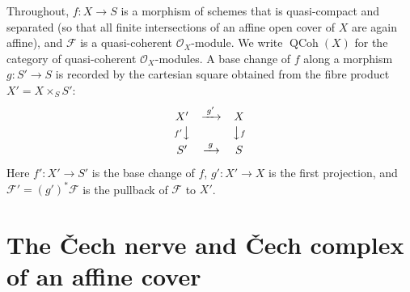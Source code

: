 Throughout, \(f : X \to S\) is a morphism of schemes that is quasi-compact and
separated (so that all finite intersections of an affine open cover of \(X\) are
again affine), and \(\mathcal{F}\) is a quasi-coherent \(\mathcal{O}_X\)-module. We
write \(\operatorname{QCoh}(X)\) for the category of quasi-coherent
\(\mathcal{O}_X\)-modules. A base change of \(f\) along a morphism \(g : S' \to S\)
is recorded by the cartesian square obtained from the fibre product
\(X' = X \times_S S'\):
\[
  \begin{array}{ccc}
    X' & \xrightarrow{\;g'\;} & X \\[2pt]
    {\scriptstyle f'}\big\downarrow & & \big\downarrow{\scriptstyle f} \\[2pt]
    S' & \xrightarrow{\;g\;} & S
  \end{array}
\]
Here \(f' : X' \to S'\) is the base change of \(f\), \(g' : X' \to X\) is the first
projection, and \(\mathcal{F}' = (g')^*\mathcal{F}\) is the pullback of
\(\mathcal{F}\) to \(X'\).

\section{The {\v C}ech nerve and {\v C}ech complex of an affine cover}

